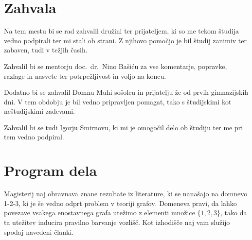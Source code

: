 \documentclass[12pt,a4paper,twoside]{article}
\theoremstyle{definition} %
\theoremstyle{plain} %
\numberwithin{equation}{section}  %
\renewcommand{\listfigurename}{Kazalo slik}%
\begin{document}
%
%
%
%
%

\section*{Zahvala}
Na tem mestu bi se rad zahvalil družini ter prijateljem, ki so me tekom študija vedno podpirali ter mi stali ob strani. Z njihovo pomočjo je bil študij zanimiv ter zabaven, tudi v težjih časih.

Zahvalil bi se mentorju doc.~dr.~Nino Bašiću za vse komentarje, popravke, razlage in nasvete ter potrpežljivost in voljo na koncu.

Dodatno bi se zahvalil Domnu Muhi sošolcu in prijatelju že od prvih gimnazijskih dni. V tem obdobju je bil vedno pripravljen pomagat, tako s študijskimi kot neštudijskimi zadevami.

Zahvalil bi se tudi Igorju Smirnovu, ki mi je omogočil delo ob študiju ter me pri tem vedno podpiral.

\cleardoublepage

\tableofcontents


\cleardoublepage

\section*{Program dela}
Magisterij naj obravnava znane rezultate iz literature, ki se nanašajo na domnevo 1-2-3,
ki je še vedno odprt problem v teoriji grafov. Domeneva pravi, da lahko povezave
vsakega enostavnega grafa utežimo z elementi množice $\{1, 2, 3\}$, tako da ta utežitev
inducira pravilno barvanje vozlišč. Kot izhodišče naj vam služijo spodaj navedeni članki.
\end{document}

